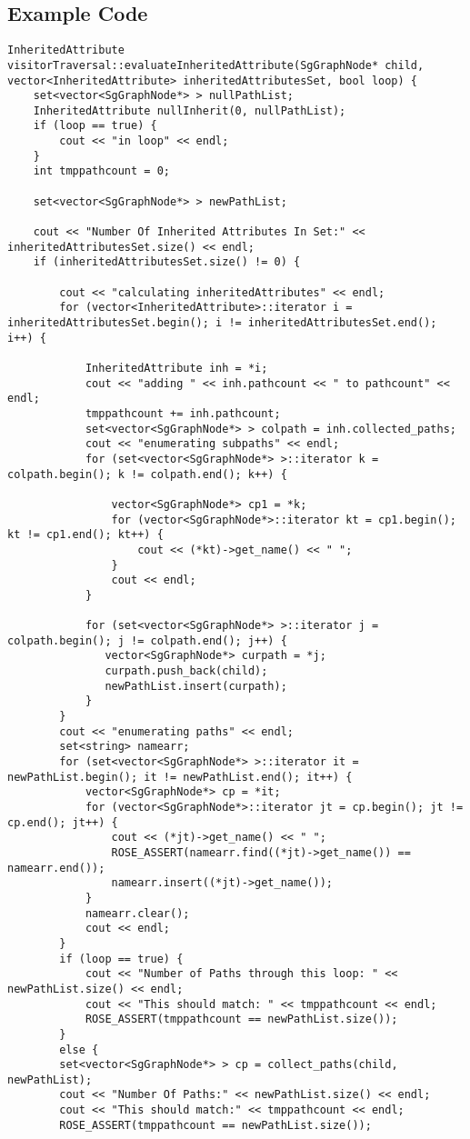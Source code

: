 \subsection{Example Code} 
\begin{verbatim}
InheritedAttribute visitorTraversal::evaluateInheritedAttribute(SgGraphNode* child, vector<InheritedAttribute> inheritedAttributesSet, bool loop) {
    set<vector<SgGraphNode*> > nullPathList;
    InheritedAttribute nullInherit(0, nullPathList);
    if (loop == true) {
        cout << "in loop" << endl;
    }
    int tmppathcount = 0;
    
    set<vector<SgGraphNode*> > newPathList;
    
    cout << "Number Of Inherited Attributes In Set:" << inheritedAttributesSet.size() << endl;
    if (inheritedAttributesSet.size() != 0) {
         
        cout << "calculating inheritedAttributes" << endl;
        for (vector<InheritedAttribute>::iterator i = inheritedAttributesSet.begin(); i != inheritedAttributesSet.end(); i++) {
            
            InheritedAttribute inh = *i;
            cout << "adding " << inh.pathcount << " to pathcount" << endl;
            tmppathcount += inh.pathcount;
            set<vector<SgGraphNode*> > colpath = inh.collected_paths;
            cout << "enumerating subpaths" << endl;
            for (set<vector<SgGraphNode*> >::iterator k = colpath.begin(); k != colpath.end(); k++) {
                
                vector<SgGraphNode*> cp1 = *k;
                for (vector<SgGraphNode*>::iterator kt = cp1.begin(); kt != cp1.end(); kt++) {
                    cout << (*kt)->get_name() << " ";
                }
                cout << endl;
            }
                  
            for (set<vector<SgGraphNode*> >::iterator j = colpath.begin(); j != colpath.end(); j++) {
               vector<SgGraphNode*> curpath = *j;
               curpath.push_back(child);
               newPathList.insert(curpath);
            }
        }
        cout << "enumerating paths" << endl;
        set<string> namearr;
        for (set<vector<SgGraphNode*> >::iterator it = newPathList.begin(); it != newPathList.end(); it++) {
            vector<SgGraphNode*> cp = *it;
            for (vector<SgGraphNode*>::iterator jt = cp.begin(); jt != cp.end(); jt++) {
                cout << (*jt)->get_name() << " ";
                ROSE_ASSERT(namearr.find((*jt)->get_name()) == namearr.end());
                namearr.insert((*jt)->get_name());
            }
            namearr.clear();
            cout << endl;
        }
        if (loop == true) {
            cout << "Number of Paths through this loop: " << newPathList.size() << endl;
            cout << "This should match: " << tmppathcount << endl;
            ROSE_ASSERT(tmppathcount == newPathList.size());
        }
        else {
        set<vector<SgGraphNode*> > cp = collect_paths(child, newPathList);
        cout << "Number Of Paths:" << newPathList.size() << endl;
        cout << "This should match:" << tmppathcount << endl;
        ROSE_ASSERT(tmppathcount == newPathList.size());
        

\end{verbatim}
